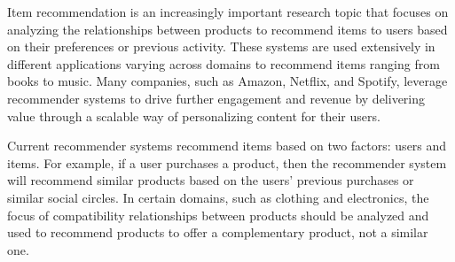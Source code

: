 



\indent Item recommendation is an increasingly important research topic that focuses on analyzing the relationships between products to recommend items to users based on their preferences or previous activity. These systems are used extensively in different applications varying across domains to recommend items ranging from books to music. Many companies, such as Amazon, Netflix, and Spotify, leverage recommender systems to drive further engagement and revenue by delivering value through a scalable way of personalizing content for their users.

\indent Current recommender systems recommend items based on two factors: users and items. For example, if a user purchases a product, then the recommender system will recommend similar products based on the users' previous purchases or similar social circles. In certain domains, such as clothing and electronics, the focus of compatibility relationships between products should be analyzed and used to recommend products to offer a complementary product, not a similar one.

